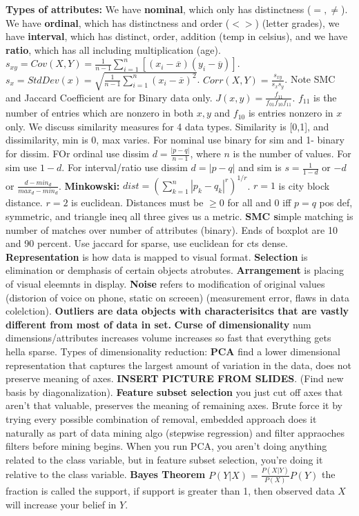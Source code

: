 \documentclass{amsbook}
\theoremstyle{plain}
\numberwithin{section}{chapter}
\numberwithin{equation}{chapter}
\theoremstyle{definition}
\theoremstyle{remark}
\newcommand{\bb}{\vspace{3mm}}
\newcommand{\fracc}{\frac}
\newcommand{\lpar}{\left(}
\newcommand{\rpar}{\right)}
\renewcommand{\bar}{\overline}%
\begin{document}
\bb\bb\bb\bb\bb\bb\bb
\vspace{300mm}
\textbf{Types of attributes:} We have \textbf{nominal}, which only has distinctness ($=,\neq$). We have \textbf{ordinal}, which has distinctness and order ($<>$) (letter grades), we have \textbf{interval}, which has distinct, order, addition (temp in celsius), and we have \textbf{ratio}, which has all including multiplication (age). \\
$s_{xy} = Cov(X,Y) = \fracc{1}{n - 1}\sum_{i = 1}^n[(x_i - \bar{x})(y_i - \bar{y})]$. $s_x = StdDev(x) = \sqrt{\fracc{1}{n - 1}\sum_{i  =1}^n(x_i - \bar{x})^2}$. $Corr(X,Y) = \fracc{s_{xy}}{s_xs_y}$. Note SMC and Jaccard Coefficient  are for Binary data only. $J(x,y) = \fracc{f_{11}}{f_{01}f_{10}f_{11}}$. $f_{11}$ is the number of entries which are nonzero in both $x,y$ and $f_{10}$ is entries nonzero in $x$ only. We discuss similarity measures for 4 data types. Similarity is [0,1], and dissimilarity, min is 0, max varies. For nominal use binary for sim and 1- binary for dissim. FOr ordinal use  dissim $d = \fracc{|p - q|}{n - 1}$, where $n$ is the number of values. For sim use $1 - d$. For interval/ratio use dissim $d = |p - q|$ and sim is $s = \fracc{1}{1 - d}$ or $-d$ or $\fracc{d - min_d}{max_d - min_d}$. \textbf{Minkowski: } $dist = \lpar \sum_{k = 1}^n|p_k - q_k|^r \rpar^{1/r}$. $r = 1$ is city block distance. $r = 2$ is euclidean. Distances must be $\geq 0$ for all and 0 iff $p =q$ pos def, symmetric, and triangle ineq all three gives us a metric. \textbf{SMC s}imple matching is number of matches over number of attributes (binary). Ends of boxplot are 10 and 90 percent. Use jaccard for sparse, use euclidean for cts dense. \textbf{Representation} is how data is mapped to visual format. \textbf{Selection} is elimination or demphasis of certain objects atrobutes. \textbf{Arrangement} is placing of visual eleemnts in display. \textbf{Noise} refers to modification of original values (distorion of voice on phone, static on screeen) (measurement error, flaws in data colelction). \textbf{Outliers are data objects with characterisitcs that are vastly different from most of data in set. }\textbf{Curse of dimensionality} num dimensions/attributes increases volume increases so fast that everything gets hella sparse. Types of dimensionality reduction: \textbf{PCA} find a lower dimensional representation that captures the largest amount of variation in the data, does not preserve meaning of axes. \textbf{INSERT PICTURE FROM SLIDES}. (Find new basis by diagonalization). \textbf{Feature subset selection} you just cut off axes that aren't that valuable, preserves the meaning of remaining axes. Brute force it by trying every possible combination of removal, embedded approach does it naturally as part of data mining algo (stepwise regression) and filter appraoches filters before mining begins. When you run PCA, you aren't doing anything related to the class variable, but in feature subset selection, you're doing it relative to the class variable. \textbf{Bayes Theorem} $P(Y|X) = \fracc{P(X|Y)}{P(X)}P(Y)$ the fraction is called the support, if support is greater than 1, then observed data $X$ will increase your belief in $Y$. \\
\end{document}
